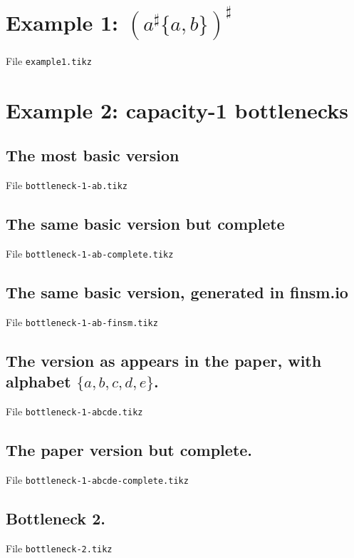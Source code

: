 \documentclass{article}
\begin{document}
\section{Example 1: $(a^\sharp\{a,b\})^\sharp$} 
%
File {\tt example1.tikz}

 



\section{Example 2: capacity-1 bottlenecks}

\subsection{The most basic version}

File {\tt bottleneck-1-ab.tikz}

 

\subsection{The same basic version but complete}

File {\tt bottleneck-1-ab-complete.tikz}

 

\subsection{The same basic version, generated in finsm.io}

File {\tt bottleneck-1-ab-finsm.tikz}

 

\subsection{The version as appears in the paper, with alphabet $\{a,b,c,d,e\}$.}

File {\tt bottleneck-1-abcde.tikz}

 

\subsection{The paper version but complete.}

File {\tt bottleneck-1-abcde-complete.tikz}

 

\subsection{Bottleneck 2.}

File {\tt bottleneck-2.tikz}

 
\end{document}
